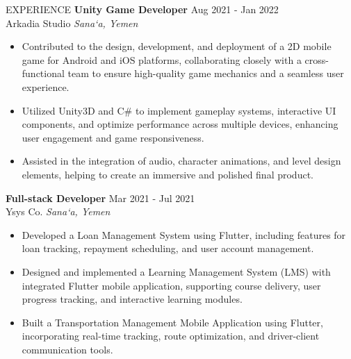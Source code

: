 \documentclass{resume} %
\begin{document}
\begin{rSection}{EXPERIENCE}
\textbf{Unity Game Developer} \hfill Aug 2021 - Jan 2022\\
Arkadia Studio \hfill \textit{Sana‘a, Yemen}
 \begin{itemize}
    \itemsep -3pt {}
    \item Contributed to the design, development, and deployment of a 2D mobile game for Android and iOS platforms, collaborating closely with a cross-functional team to ensure high-quality game mechanics and a seamless user experience. 
    \item  Utilized Unity3D and C\# to implement gameplay systems, interactive UI components, and optimize performance across multiple devices, enhancing user engagement and game responsiveness. 
    \item Assisted in the integration of audio, character animations, and level design elements, helping to create an immersive and polished final product.
 \end{itemize}

\textbf{Full-stack Developer} \hfill Mar 2021 - Jul 2021\\
Ysys Co. \hfill \textit{Sana‘a, Yemen}
 \begin{itemize}
    \itemsep -3pt {}
    \item Developed a Loan Management System using Flutter, including features for loan tracking, repayment scheduling, and user account management. 
    \item Designed and implemented a Learning Management System (LMS) with integrated Flutter mobile application, supporting course delivery, user progress tracking, and interactive learning modules.
    \item Built a Transportation Management Mobile Application using Flutter, incorporating real-time tracking, route optimization, and driver-client communication tools. 
 \end{itemize}
 
\end{rSection} 

\end{document}
